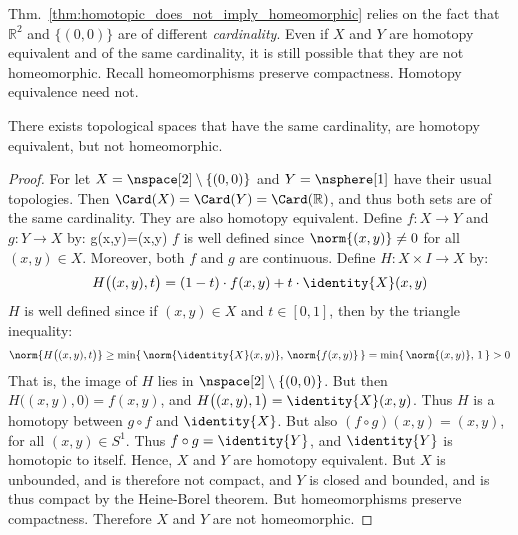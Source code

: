 \documentclass[oneside]{book}                                                  %
\begin{document}
                Thm.~\ref{thm:homotopic_does_not_imply_homeomorphic} relies on
                the fact that $\mathbb{R}^{2}$ and $\{(0,0)\}$ are of different
                \textit{cardinality}. Even if $X$ and $Y$ are homotopy
                equivalent and of the same cardinality, it is still possible
                that they are not homeomorphic. Recall homeomorphisms
                preserve compactness. Homotopy equivalence need not.
                \begin{theorem}
                    \label{thm:HE_of_Punc_Plane_and_Circle_Not_Homeo}%
                    There exists topological spaces that have the same
                    cardinality, are homotopy equivalent, but not homeomorphic.
                \end{theorem}
                \begin{proof}
                    For let $X=\nspace[2]\setminus\{(0,0)\}$ and
                    $Y=\nsphere[1]$ have their usual topologies. Then
                    $\Card(X)=\Card(Y)=\Card(\mathbb{R})$, and thus both sets
                    are of the same cardinality. They are also homotopy
                    equivalent. Define $f:X\rightarrow{Y}$ and
                    $g:Y\rightarrow{X}$ by:
                                {g(x,y)=(x,y)}
                    $f$ is well defined since $\norm{(x,y)}\ne{0}$ for all
                    $(x,y)\in{X}$. Moreover, both $f$ and $g$ are continuous.
                    Define $H:X\times{I}\rightarrow{X}$ by:
                    \begin{equation}
                        H\big((x,y),t\big)
                        =(1-t)\cdot{f}(x,y)+t\cdot\identity{X}(x,y)
                    \end{equation}
                    $H$ is well defined since if $(x,y)\in{X}$ and $t\in[0,1]$,
                    then by the triangle inequality:
                    \begin{equation}
                        \norm{H\big((x,y),t\big)}
                        \geq\min\{\,%
                            \norm{\identity{X}(x,y)},\,
                            \norm{f(x,y)}\,\}
                        =\min\{\,%
                            \norm{(x,y)},\,
                            1\,\}
                        >0
                    \end{equation}
                    That is, the image of $H$ lies in
                    $\nspace[2]\setminus\{(0,0)\}$. But then
                    $H\big((x,y),0\big)=f(x,y)$, and
                    $H\big((x,y),1\big)=\identity{X}(x,y)$. Thus $H$ is a
                    homotopy between ${g}\circ{f}$ and $\identity{X}$. But also
                    $({f}\circ{g})(x,y)=(x,y)$, for all $(x,y)\in S^{1}$. Thus
                    ${f}\circ{g}=\identity{Y}$, and $\identity{Y}$ is homotopic
                    to itself. Hence, $X$ and $Y$ are homotopy equivalent. But
                    $X$ is unbounded, and is therefore not compact, and $Y$ is
                    closed and bounded, and is thus compact by the Heine-Borel
                    theorem. But homeomorphisms preserve compactness. Therefore
                    $X$ and $Y$ are not homeomorphic.
                \end{proof}
\end{document}
